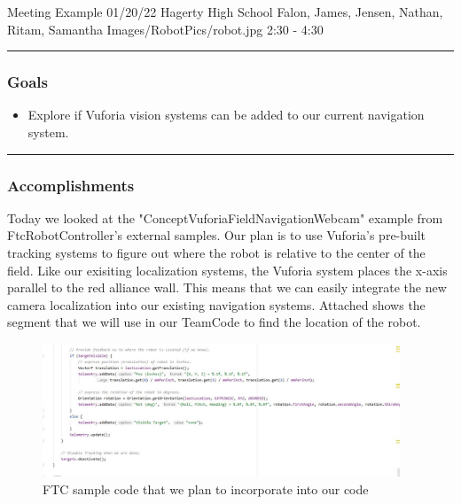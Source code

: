 \insertmeeting 
	{Meeting Example} 
	{01/20/22} 
	{Hagerty High School}
	{Falon, James, Jensen, Nathan, Ritam, Samantha}
	{Images/RobotPics/robot.jpg}
	{2:30 - 4:30}
	
\noindent\hfil\rule{\textwidth}{.4pt}\hfil
\subsubsection*{Goals}
\begin{itemize}
    \item Explore if Vuforia vision systems can be added to our current navigation system.  

\end{itemize} 

\noindent\hfil\rule{\textwidth}{.4pt}\hfil

\subsubsection*{Accomplishments}
Today we looked at the "ConceptVuforiaFieldNavigationWebcam" example from FtcRobotController's external samples. Our plan is to use Vuforia's pre-built tracking systems to figure out where the robot is relative to the center of the field. Like our exisiting localization systems, the Vuforia system places the x-axis parallel to the red alliance wall. This means that we can easily integrate the new camera localization into our existing navigation systems. Attached shows the segment that we will use in our TeamCode to find the location of the robot. 

\begin{figure}[htp]
\centering
\includegraphics[width=0.95\textwidth, angle=0]{Meetings/January/01-20-22/1.20.22 vuforia localization spot - James Hu.JPG}
\caption{FTC sample code that we plan to incorporate into our code}
\label{fig:012022_1}
\end{figure}



